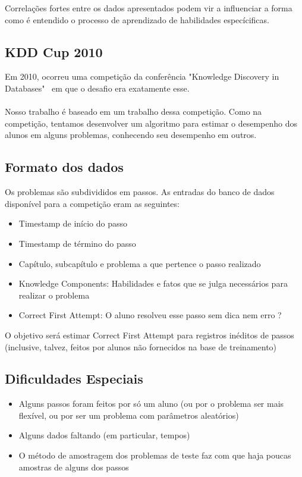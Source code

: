 \documentclass{article}
\begin{document}
         Correlações fortes entre os dados apresentados podem vir a influenciar a forma como é entendido o processo de aprendizado de habilidades especícificas.

   \subsection{KDD Cup 2010}

      Em 2010, ocorreu uma competição da conferência "Knowledge Discovery in Databases" \ em que o desafio era exatamente esse.
      \\~\\
      Nosso trabalho é baseado em um trabalho dessa competição. Como na competição, tentamos desenvolver um algoritmo para estimar o desempenho dos alunos em alguns problemas, conhecendo seu desempenho em outros.



   \subsection{Formato dos dados}
     Os problemas são subdivididos em passos. As entradas do banco de dados disponível para a competição eram as seguintes:
     
     \begin{itemize}
     \item Timestamp de início do passo
     \item Timestamp de término do passo
     \item Capítulo, subcapítulo e problema a que pertence o passo realizado
     \item Knowledge Components: Habilidades e fatos que se julga necessários para realizar o problema
     \item Correct First Attempt: O aluno resolveu esse passo sem dica nem erro ?
     \end{itemize}
     
     O objetivo será estimar Correct First Attempt para registros inéditos de passos (inclusive, talvez, feitos por alunos não fornecidos na base de treinamento)


   \subsection{Dificuldades Especiais}
     \begin{itemize}
     \item Alguns passos foram feitos por só um aluno (ou por o problema ser mais flexível, ou por ser um problema com parâmetros aleatórios)
     \item Alguns dados faltando (em particular, tempos)
     \item O método de amostragem dos problemas de teste faz com que haja poucas amostras de alguns dos passos
     \end{itemize}
\end{document}
